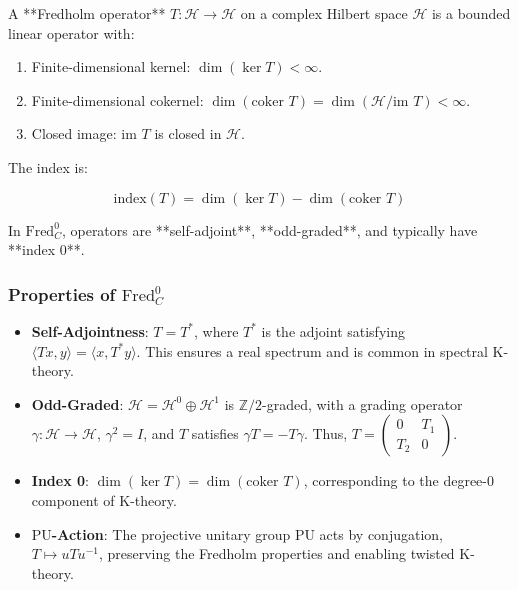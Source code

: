 \documentclass{article}
\theoremstyle{definition}
\begin{document}
A **Fredholm operator** \(T: \mathscr{H} \to \mathscr{H}\) on a complex Hilbert space \(\mathscr{H}\) is a bounded linear operator with:

\begin{enumerate}
    \item Finite-dimensional kernel: \(\dim(\ker T) < \infty\).
    \item Finite-dimensional cokernel: \(\dim(\text{coker } T) = \dim(\mathscr{H} / \text{im } T) < \infty\).
    \item Closed image: \(\text{im } T\) is closed in \(\mathscr{H}\).
\end{enumerate}

The index is:

\begin{equation}
\text{index}(T) = \dim(\ker T) - \dim(\text{coker } T)
\end{equation}

In \(\text{Fred}^0_C\), operators are **self-adjoint**, **odd-graded**, and typically have **index 0**.

\subsubsection{Properties of \(\text{Fred}^0_C\)}

\begin{itemize}
    \item \textbf{Self-Adjointness}: \(T = T^*\), where \(T^*\) is the adjoint satisfying \(\langle T x, y \rangle = \langle x, T^* y \rangle\). This ensures a real spectrum and is common in spectral K-theory.
    \item \textbf{Odd-Graded}: \(\mathscr{H} = \mathscr{H}^0 \oplus \mathscr{H}^1\) is \(\mathbb{Z}/2\)-graded, with a grading operator \(\gamma: \mathscr{H} \to \mathscr{H}\), \(\gamma^2 = I\), and \(T\) satisfies \(\gamma T = -T \gamma\). Thus, \(T = \begin{pmatrix} 0 & T_1 \\ T_2 & 0 \end{pmatrix}\).
    \item \textbf{Index 0}: \(\dim(\ker T) = \dim(\text{coker } T)\), corresponding to the degree-0 component of K-theory.
    \item \textbf{\(\mathrm{PU}\)-Action}: The projective unitary group \(\mathrm{PU}\) acts by conjugation, \(T \mapsto u T u^{-1}\), preserving the Fredholm properties and enabling twisted K-theory.
\end{itemize}
\end{document}
